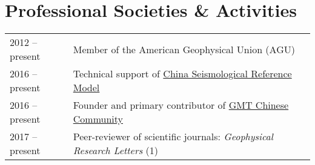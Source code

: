 \section*{Professional Societies \& Activities}

\begin{tabular}{ll}
2012 -- present & Member of the American Geophysical Union (AGU) \\
2016 -- present & Technical support of \href{http://chinageorefmodel.org/}{China Seismological Reference Model} \\
2016 -- present & Founder and primary contributor of \href{http://gmt-china.org/}{GMT Chinese Community} \\
2017 -- present & Peer-reviewer of scientific journals: \textit{Geophysical Research Letters} (1) \\
\end{tabular}
